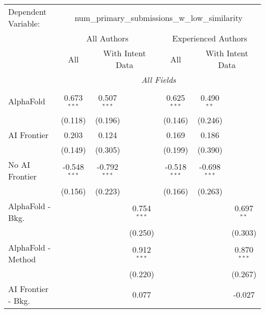 \begingroup
\centering
\begin{tabular}{lcccccc}
   \tabularnewline \midrule \midrule
   Dependent Variable: & \multicolumn{6}{c}{num\_primary\_submissions\_w\_low\_similarity}\\
 & \multicolumn{3}{c}{All Authors} & \multicolumn{3}{c}{Experienced Authors} \\
\cmidrule(lr){2-4} \cmidrule(lr){5-7}
 & \multicolumn{1}{c}{All} & \multicolumn{2}{c}{With Intent Data} & \multicolumn{1}{c}{All} & \multicolumn{2}{c}{With Intent Data} \\
\cmidrule(lr){2-2} \cmidrule(lr){3-4} \cmidrule(lr){5-5} \cmidrule(lr){6-7}
 & \multicolumn{6}{c}{\textit{All Fields}} \\ \\
   AlphaFold               & 0.673$^{***}$  & 0.507$^{***}$  &               & 0.625$^{***}$  & 0.490$^{**}$   &   \\   
                           & (0.118)        & (0.196)        &               & (0.146)        & (0.246)        &   \\   
   AI Frontier             & 0.203          & 0.124          &               & 0.169          & 0.186          &   \\   
                           & (0.149)        & (0.305)        &               & (0.199)        & (0.390)        &   \\   
   No AI Frontier          & -0.548$^{***}$ & -0.792$^{***}$ &               & -0.518$^{***}$ & -0.698$^{***}$ &   \\   
                           & (0.156)        & (0.223)        &               & (0.166)        & (0.263)        &   \\   
   AlphaFold - Bkg.        &                &                & 0.754$^{***}$ &                &                & 0.697$^{**}$\\   
                           &                &                & (0.250)       &                &                & (0.303)\\   
   AlphaFold - Method      &                &                & 0.912$^{***}$ &                &                & 0.870$^{***}$\\   
                           &                &                & (0.220)       &                &                & (0.267)\\   
   AI Frontier - Bkg.      &                &                & 0.077         &                &                & -0.027\\   

\end{tabular}

